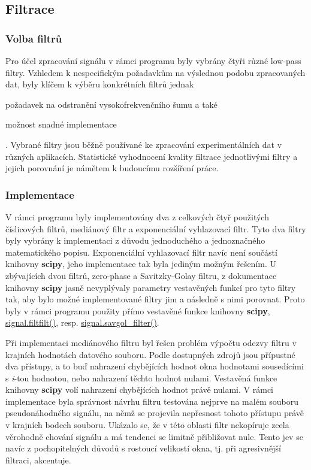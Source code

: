 \documentclass[a4paper, 12pt]{article}
\begin{document}
\subsection{Filtrace}
\subsubsection{Volba filtrů}
Pro účel zpracování signálu v rámci programu byly vybrány čtyři různé low-pass filtry. Vzhledem k nespecifickým požadavkům na výslednou podobu zpracovaných dat, byly klíčem k výběru konkrétních filtrů jednak 
\begin{inparaenum}[($i$)]
\item požadavek na odstranění vysokofrekvenčního šumu
a také
\item možnost snadné implementace\end{inparaenum}. Vybrané filtry jsou běžně používané ke zpracování experimentálních dat v různých aplikacích. Statistické vyhodnocení kvality filtrace jednotlivými filtry a jejich porovnání je námětem k budoucímu rozšíření práce.
\subsubsection{Implementace} \label{implementace}
V rámci programu byly implementovány dva z celkových čtyř použitých číslicových filtrů, mediánový filtr a exponenciální vyhlazovací filtr. Tyto dva filtry byly vybrány k implementaci z důvodu jednoduchého a jednoznačného matematického popisu. Exponenciální vyhlazovací filtr navíc není součástí knihovny \textbf{scipy}, jeho implementace tak byla jediným možným řešením.  U zbývajících dvou filtrů, zero-phase a Savitzky-Golay filtru, z dokumentace knihovny \textbf{scipy} jasně nevyplývaly parametry vestavěných funkcí pro tyto filtry tak, aby bylo možné implementované filtry jim  a následně s nimi porovnat. Proto byly v rámci programu použity přímo vestavěné funkce knihovny \textbf{scipy}, \url{signal.filtfilt()}, resp. \url{signal.savgol_filter()}.
\vskip 0.1in

\noindent Při implementaci mediánového filtru byl řešen problém výpočtu odezvy filtru v krajních hodnotách datového souboru. Podle dostupných zdrojů jsou přípustné dva přístupy, a to buď nahrazení chybějících hodnot okna hodnotami sousedícími s \textit{i}-tou hodnotou, nebo nahrazení těchto hodnot nulami. Vestavěná funkce knihovny \textbf{scipy} volí nahrazení chybějících hodnot právě nulami. V rámci implementace byla správnost návrhu filtru testována nejprve na malém souboru pseudonáhodného signálu, na němž se projevila nepřesnost tohoto přístupu právě v krajních bodech souboru. Ukázalo se, že v této oblasti filtr nekopíruje zcela věrohodně chování signálu a má tendenci se limitně přibližovat nule. Tento jev se navíc z pochopitelných důvodů s rostoucí velikostí okna, tj. při agresivnější filtraci, akcentuje.
\end{document}

